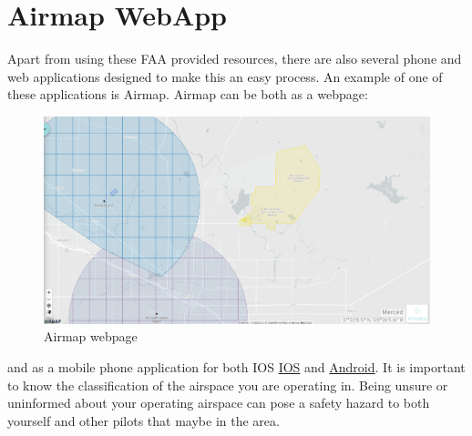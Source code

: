 \documentclass[
]{book}
\begin{document}
\hypertarget{airmap-webapp}{%
\section{Airmap WebApp}\label{airmap-webapp}}

Apart from using these FAA provided resources, there are also several phone and web applications designed to make this an easy process. An example of one of these applications is Airmap. Airmap can be both as a webpage:

\begin{figure}
\centering
\includegraphics{images/Airmap-Web.png}
\caption{Airmap webpage}
\end{figure}

and as a mobile phone application for both IOS \href{https://apps.apple.com/us/app/airmap-for-drones/id1042824733}{IOS} and \href{https://play.google.com/store/apps/details?id=com.airmap.airmap\&hl=en_US}{Android}. It is important to know the classification of the airspace you are operating in. Being unsure or uninformed about your operating airspace can pose a safety hazard to both yourself and other pilots that maybe in the area.
\end{document}
